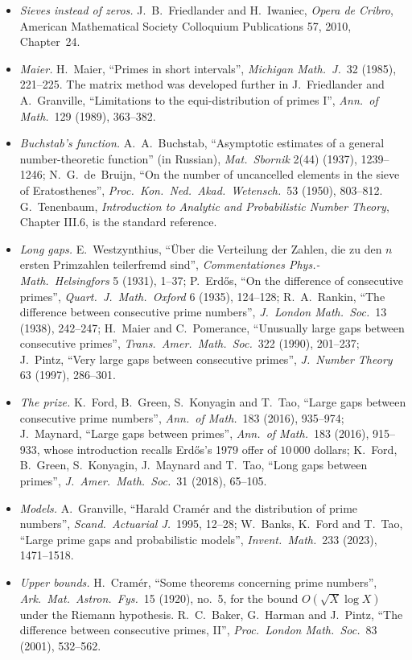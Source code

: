 \begin{itemize}
\item \emph{Sieves instead of zeros.} J.~B.~Friedlander and H.~Iwaniec, \emph{Opera de Cribro}, American Mathematical Society Colloquium Publications 57, 2010, Chapter~24.
\item \emph{Maier.} H.~Maier, ``Primes in short intervals'', \emph{Michigan Math.\ J.}\ 32 (1985), 221--225. The matrix method was developed further in J.~Friedlander and A.~Granville, ``Limitations to the equi-distribution of primes I'', \emph{Ann.\ of Math.}\ 129 (1989), 363--382.
\item \emph{Buchstab's function.} A.~A.~Buchstab, ``Asymptotic estimates of a general number-theoretic function'' (in Russian), \emph{Mat.\ Sbornik} 2(44) (1937), 1239--1246; N.~G.~de~Bruijn, ``On the number of uncancelled elements in the sieve of Eratosthenes'', \emph{Proc.\ Kon.\ Ned.\ Akad.\ Wetensch.}\ 53 (1950), 803--812. G.~Tenenbaum, \emph{Introduction to Analytic and Probabilistic Number Theory}, Chapter III.6, is the standard reference.
\item \emph{Long gaps.} E.~Westzynthius, ``Über die Verteilung der Zahlen, die zu den $n$ ersten Primzahlen teilerfremd sind'', \emph{Commentationes Phys.-Math.\ Helsingfors} 5 (1931), 1--37; P.~Erd\H{o}s, ``On the difference of consecutive primes'', \emph{Quart.\ J.\ Math.\ Oxford} 6 (1935), 124--128; R.~A.~Rankin, ``The difference between consecutive prime numbers'', \emph{J.\ London Math.\ Soc.}\ 13 (1938), 242--247; H.~Maier and C.~Pomerance, ``Unusually large gaps between consecutive primes'', \emph{Trans.\ Amer.\ Math.\ Soc.}\ 322 (1990), 201--237; J.~Pintz, ``Very large gaps between consecutive primes'', \emph{J.\ Number Theory} 63 (1997), 286--301.
\item \emph{The prize.} K.~Ford, B.~Green, S.~Konyagin and T.~Tao, ``Large gaps between consecutive prime numbers'', \emph{Ann.\ of Math.}\ 183 (2016), 935--974; J.~Maynard, ``Large gaps between primes'', \emph{Ann.\ of Math.}\ 183 (2016), 915--933, whose introduction recalls Erd\H{o}s's 1979 offer of $10\,000$ dollars; K.~Ford, B.~Green, S.~Konyagin, J.~Maynard and T.~Tao, ``Long gaps between primes'', \emph{J.\ Amer.\ Math.\ Soc.}\ 31 (2018), 65--105.
\item \emph{Models.} A.~Granville, ``Harald Cramér and the distribution of prime numbers'', \emph{Scand.\ Actuarial J.}\ 1995, 12--28; W.~Banks, K.~Ford and T.~Tao, ``Large prime gaps and probabilistic models'', \emph{Invent.\ Math.}\ 233 (2023), 1471--1518.
\item \emph{Upper bounds.} H.~Cram\'er, ``Some theorems concerning prime numbers'', \emph{Ark.\ Mat.\ Astron.\ Fys.}\ 15 (1920), no.~5, for the bound $O(\sqrt X\log X)$ under the Riemann hypothesis. R.~C.~Baker, G.~Harman and J.~Pintz, ``The difference between consecutive primes, II'', \emph{Proc.\ London Math.\ Soc.}\ 83 (2001), 532--562.
\end{itemize}
